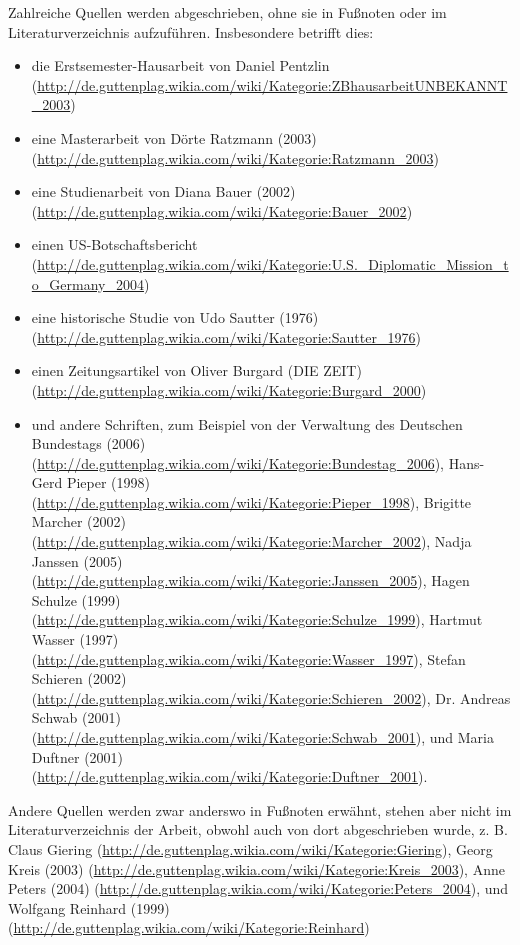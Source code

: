 \documentclass[ngerman,final,fontsize=12pt,paper=a4,twoside,BCOR=8mm,draft=false]{scrartcl}
\begin{document}
Zahlreiche Quellen werden abgeschrieben, ohne sie in Fußnoten oder im Literaturverzeichnis aufzuführen. Insbesondere betrifft dies:
\begin{itemize}

\item die Erstsemester-Hausarbeit von Daniel Pentzlin (\url{http://de.guttenplag.wikia.com/wiki/Kategorie:ZBhausarbeitUNBEKANNT\_2003})
\item eine Masterarbeit von Dörte Ratzmann (2003) (\url{http://de.guttenplag.wikia.com/wiki/Kategorie:Ratzmann\_2003})
\item eine Studienarbeit von Diana Bauer (2002) (\url{http://de.guttenplag.wikia.com/wiki/Kategorie:Bauer\_2002})
\item einen US-Botschaftsbericht (\url{http://de.guttenplag.wikia.com/wiki/Kategorie:U.S.\_Diplomatic\_Mission\_to\_Germany\_2004})
\item eine historische Studie von Udo Sautter (1976) (\url{http://de.guttenplag.wikia.com/wiki/Kategorie:Sautter\_1976})
\item einen Zeitungsartikel von Oliver Burgard (DIE ZEIT) (\url{http://de.guttenplag.wikia.com/wiki/Kategorie:Burgard\_2000})

\item und andere Schriften, zum Beispiel von der Verwaltung des
  Deutschen Bundestags (2006)
  (\url{http://de.guttenplag.wikia.com/wiki/Kategorie:Bundestag\_2006}),
    Hans-Gerd Pieper (1998)
    (\url{http://de.guttenplag.wikia.com/wiki/Kategorie:Pieper\_1998}),
    Brigitte Marcher (2002)
    (\url{http://de.guttenplag.wikia.com/wiki/Kategorie:Marcher\_2002}),
    Nadja Janssen (2005)
    (\url{http://de.guttenplag.wikia.com/wiki/Kategorie:Janssen\_2005}),
    Hagen Schulze (1999)
    (\url{http://de.guttenplag.wikia.com/wiki/Kategorie:Schulze\_1999}),
    Hartmut Wasser (1997)
    (\url{http://de.guttenplag.wikia.com/wiki/Kategorie:Wasser\_1997}),
    Stefan Schieren (2002)
    (\url{http://de.guttenplag.wikia.com/wiki/Kategorie:Schieren\_2002}),
    Dr. Andreas Schwab (2001)
    (\url{http://de.guttenplag.wikia.com/wiki/Kategorie:Schwab\_2001}), und
    Maria Duftner (2001)
    (\url{http://de.guttenplag.wikia.com/wiki/Kategorie:Duftner\_2001}).
\end{itemize}
Andere Quellen werden zwar anderswo in Fußnoten erwähnt, stehen aber
nicht im Literaturverzeichnis der Arbeit, obwohl auch von dort
abgeschrieben wurde, z. B. Claus Giering
(\url{http://de.guttenplag.wikia.com/wiki/Kategorie:Giering}), Georg
  Kreis (2003)
  (\url{http://de.guttenplag.wikia.com/wiki/Kategorie:Kreis\_2003}), Anne
  Peters (2004)
  (\url{http://de.guttenplag.wikia.com/wiki/Kategorie:Peters\_2004}), und
  Wolfgang Reinhard (1999)
  (\url{http://de.guttenplag.wikia.com/wiki/Kategorie:Reinhard})
\end{document}
